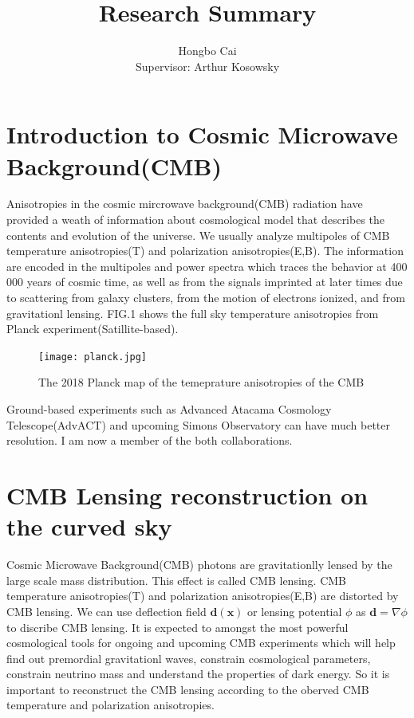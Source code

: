 \documentclass[12pt, notitlepage, onecolumn, amsmath, amssymb, aps]{revtex4-1}
\title{}
\begin{document}
\title{Research Summary}
\author{Hongbo Cai \\{\small Supervisor: Arthur Kosowsky}}
\maketitle
\newcommand{\edit}[1]{\textcolor{red}{(#1)}}
\vspace{-1.5cm}
\section{Introduction to Cosmic Microwave Background(CMB)}
\label{sec:org8852578}

Anisotropies in the cosmic mircrowave background(CMB) radiation have provided a weath of information about cosmological model that describes the contents and evolution of the universe\cite{Staggs:2018gvf}. We usually analyze multipoles of CMB temperature anisotropies(T) and polarization anisotropies(E,B). The information are encoded in the multipoles and power spectra which traces the behavior at 400 000 years of cosmic time, as well as from the signals imprinted at later times due to scattering from galaxy clusters, from the motion of electrons ionized, and from gravitationl lensing. FIG.1 shows the full sky temperature anisotropies from Planck experiment(Satillite-based).
\begin{figure}[h]
\texttt{[image: planck.jpg]}
\caption{The 2018 Planck map of the temeprature anisotropies of the CMB}
\end{figure}
Ground-based experiments such as Advanced Atacama Cosmology Telescope(AdvACT)\cite{Henderson:2015nzj} and upcoming Simons Observatory\cite{Ade:2018sbj} can have much better resolution. I am now a member of the both collaborations.

\section{CMB Lensing reconstruction on the curved sky}
\label{sec:org8852578}


Cosmic Microwave Background(CMB) photons are gravitationlly lensed by the large scale mass distribution. This effect is called CMB lensing. CMB temperature anisotropies(T) and polarization anisotropies(E,B) are distorted by CMB lensing. We can use deflection field \(\mathbf{d}(\mathbf{x})\) or lensing potential \(\phi\) as \(\mathbf{d}=\nabla \phi\) to discribe CMB lensing\cite{Lewis:2006fu}. It is expected to amongst the most powerful cosmological tools for ongoing and upcoming CMB experiments which will help find out premordial gravitationl waves, constrain cosmological parameters, constrain neutrino mass and understand the properties of dark energy. So it is important to reconstruct the CMB lensing according to the oberved CMB temperature and polarization anisotropies. 
\end{document}
